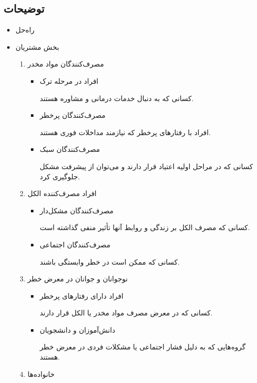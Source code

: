 \documentclass[dvipsnames, svgnames, x11names, 11pt]{article}
\begin{document}
\subsection{توضیحات}
\begin{itemize}
\item 
راه‌حل

\item 
بخش مشتریان
\begin{enumerate}
\item 
مصرف‌کنندگان مواد مخدر

\begin{itemize}
\item 
افراد در مرحله ترک

کسانی که به دنبال خدمات درمانی و مشاوره هستند.  

\item 
مصرف‌کنندگان پرخطر

افراد با رفتارهای پرخطر که نیازمند مداخلات فوری هستند.  

\item 
مصرف‌کنندگان سبک

کسانی که در مراحل اولیه اعتیاد قرار دارند و می‌توان از پیشرفت مشکل جلوگیری کرد.  
\end{itemize}

\item 
افراد مصرف‌کننده الکل
\begin{itemize}
\item 
مصرف‌کنندگان مشکل‌دار

کسانی که مصرف الکل بر زندگی و روابط آنها تأثیر منفی گذاشته است.  

\item 
مصرف‌کنندگان اجتماعی

کسانی که ممکن است در خطر وابستگی باشند.  
\end{itemize}

\item 
نوجوانان و جوانان در معرض خطر
\begin{itemize}
\item 
افراد دارای رفتارهای پرخطر

کسانی که در معرض مصرف مواد مخدر یا الکل قرار دارند.  

\item 
دانش‌آموزان و دانشجویان

گروه‌هایی که به دلیل فشار اجتماعی یا مشکلات فردی در معرض خطر هستند.  
\end{itemize}

\item 
خانواده‌ها


\end{enumerate}
\end{itemize}
\end{document}
